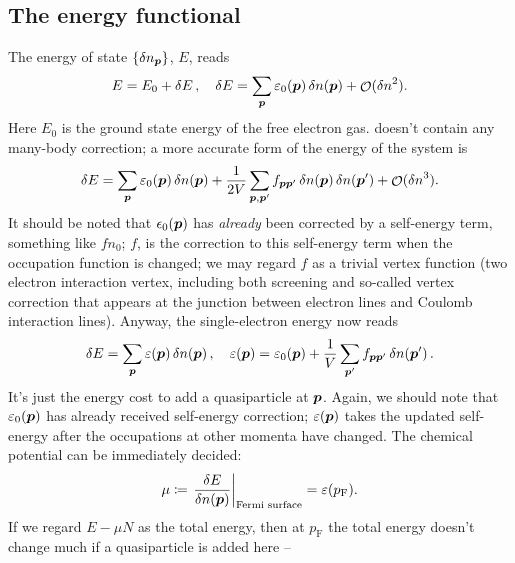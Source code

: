 \documentclass[hyperref, a4paper]{article}
\DeclareMathOperator{\bigO}{\mathcal{O}}
\newcommand*{\pfermi}{p_{\text{F}}}
\begin{document}
\subsection{The energy functional}

The energy of state $\{\var{n}_{\vb*{p}}\}$, $E$, reads 
\begin{equation}
    E = E_0 + \var{E}, \quad 
    \var{E}  = \sum_{\vb*{p}} \varepsilon_0(\vb*{p}) \var{n(\vb*{p})} + 
    \bigO(\var{n}^2).
    \label{eq:fermi-liquid.linear-energy}
\end{equation}
Here $E_0$ is the ground state energy of the free electron gas.
 doesn't contain any many-body correction; 
a more accurate form of the energy of the system is 
\begin{equation}
    \var{E} = \sum_{\vb*{p}} \varepsilon_0(\vb*{p}) \var{n(\vb*{p})}
    + \frac{1}{2 V} \sum_{\vb*{p}, \vb*{p}'}
    f_{\vb*{p} \vb*{p}'} \var{n(\vb*{p})} \var{n(\vb*{p}')} + \bigO(\var{n}^3).
    \label{eq:energy-functional}
\end{equation}
It should be noted that $\epsilon_0(\vb*{p})$ 
has \emph{already} been corrected by a self-energy term,
something like $f n_0$; 
$f$, is the correction to this self-energy term 
when the occupation function is changed;
we may regard $f$ as a trivial vertex function 
(two electron interaction vertex, 
including both screening and 
so-called vertex correction 
that appears at the junction between electron lines and Coulomb interaction lines).
Anyway, the single-electron energy now reads
\begin{equation}
    \var{E} = \sum_{\vb*{p}} \varepsilon(\vb*{p}) \var{n(\vb*{p})} , 
    \quad \varepsilon(\vb*{p}) = \varepsilon_0(\vb*{p}) 
    + \frac{1}{V} \sum_{\vb*{p}'} f_{\vb*{p} \vb*{p}'} \var{n(\vb*{p}')}.
    \label{eq:fermi-liquid.quasiparticle-energy}
\end{equation}
It's just the energy cost to add a quasiparticle at $\vb*{p}$.
Again, we should note that $\varepsilon_0(\vb*{p})$ has already received 
self-energy correction;
$\varepsilon(\vb*{p})$ takes the updated self-energy 
after the occupations at other momenta have changed.
The chemical potential can be immediately decided:
\begin{equation}
    \mu \coloneqq \eval{\fdv{E}{n(\vb*{p})}}_{\text{Fermi surface}} = \varepsilon(\pfermi).
    \label{eq:chemical-potential}
\end{equation}
If we regard $E - \mu N$ as the total energy, 
then at $\pfermi$ the total energy doesn't change much if a quasiparticle is added here -- 
\end{document}
